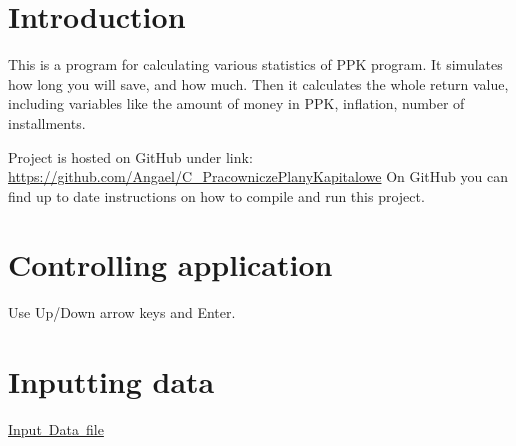 \hypertarget{index_intro}{}\section{Introduction}\label{index_intro}
This is a program for calculating various statistics of P\+PK program. It simulates how long you will save, and how much. Then it calculates the whole return value, including variables like the amount of money in P\+PK, inflation, number of installments.~\newline


Project is hosted on Git\+Hub under link\+:~\newline
 \mbox{\hyperlink{}{https\+://github.\+com/\+Angael/\+C\+\_\+\+Pracownicze\+Plany\+Kapitalowe}} On Git\+Hub you can find up to date instructions on how to compile and run this project.\hypertarget{index_b}{}\section{Controlling application}\label{index_b}
Use Up/\+Down arrow keys and Enter.\hypertarget{index_c}{}\section{Inputting data}\label{index_c}
\mbox{\hyperlink{inputDataPage}{Input Data file}} 